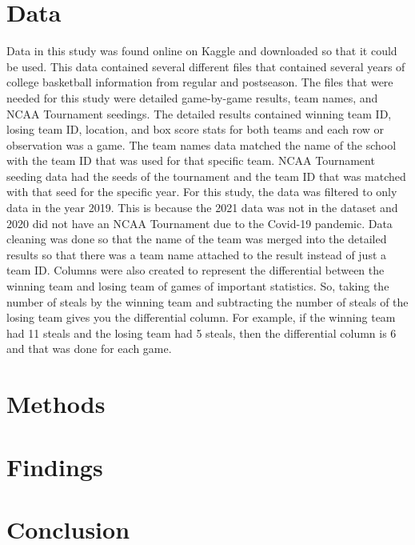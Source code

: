 \documentclass{article}
\begin{document}
\section{Data}
Data in this study was found online on Kaggle and downloaded so that it could be used. This data contained several different files that contained several years of college basketball information from regular and postseason. The files that were needed for this study were detailed game-by-game results, team names, and NCAA Tournament seedings. The detailed results contained winning team ID, losing team ID, location, and box score stats for both teams and each row or observation was a game. The team names data matched the name of the school with the team ID that was used for that specific team. NCAA Tournament seeding data had the seeds of the tournament and the team ID that was matched with that seed for the specific year.
\newline \indent For this study, the data was filtered to only data in the year 2019. This is because the 2021 data was not in the dataset and 2020 did not have an NCAA Tournament due to the Covid-19 pandemic. Data cleaning was done so that the name of the team was merged into the detailed results so that there was a team name attached to the result instead of just a team ID. Columns were also created to represent the differential between the winning team and losing team of games of important statistics. So, taking the number of steals by the winning team and subtracting the number of steals of the losing team gives you the differential column. For example, if the winning team had 11 steals and the losing team had 5 steals, then the differential column is 6 and that was done for each game. 

\section{Methods}


\section{Findings}

\section{Conclusion}

\medskip

\printbibliography
\end{document}
